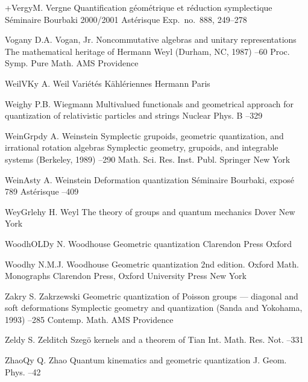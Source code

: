 \documentclass[11pt]{amsart}
\numberwithin{equation}{section}
\theoremstyle{remark}
\newcommand{\by}{\mathbf y}
\begin{document}
\begin{thebibliography}{199}
 +Verg\by{M. Vergne \paper Quantification g\'eom\'etrique et r\'eduction
symplectique \paperinfo S\'eminaire Bourbaki 2000/2001 \jour Ast\'erisque   \pages Exp.~no.~888, 249--278}

 Vogan\by{ D.A. Vogan, Jr. \paper Noncommutative algebras and unitary
representations \inbook The mathematical heritage of Hermann Weyl (Durham, NC,
1987) --60 \bookinfo Proc. Symp. Pure Math.  \publ AMS
\publaddr Providence }

 WeilVK\by{ A. Weil \book Vari\'et\'es K\"ahl\'eriennes \publ Hermann
\publaddr Paris }

 Weigh\by{ P.B. Wiegmann \paper Multivalued functionals and geometrical
approach for quantization of relativistic particles and strings \jour Nuclear
Phys. B   --329}

 WeinGrpd\by{ A. Weinstein \paper Symplectic grupoids, geometric
quantization, and irrational rotation algebras \inbook Symplectic geometry,
grupoids, and integrable systems (Berkeley, 1989) --290 \bookinfo
Math. Sci. Res. Inst. Publ.  \publ Springer \publaddr New York }

 WeinAst\by{ A. Weinstein \paper Deformation quantization \paperinfo
S\'eminaire Bourbaki, expos\'e 789 \jour Ast\'erisque   --409}

 WeyGrleh\by{ H. Weyl \book The theory of groups and quantum mechanics
\publ Dover \publaddr New York }

 WoodhOLD\by{ N. Woodhouse \book Geometric quantization \publ Clarendon
Press \publaddr Oxford }

 Woodh\by{ N.M.J. Woodhouse \book Geometric quantization \bookinfo 2nd
edition. Oxford Math. Monographs \publ Clarendon Press, Oxford University Press
\publaddr New York }

 Zakr\by{ S. Zakrzewski \paper Geometric quantization of Poisson groups
--- diagonal and soft deformations \inbook Symplectic geometry and quantization
(Sanda and Yokohama, 1993) --285 \bookinfo Contemp. Math. 
\publ AMS \publaddr Providence }

 Zeld\by{ S. Zelditch \paper Szeg\"o kernels and a theorem of Tian
\jour Int. Math. Res. Not.   --331}

 ZhaoQ\by{ Q. Zhao \paper Quantum kinematics and geometric quantization
\jour J. Geom. Phys.   --42}

\end{thebibliography}
\end{document}

